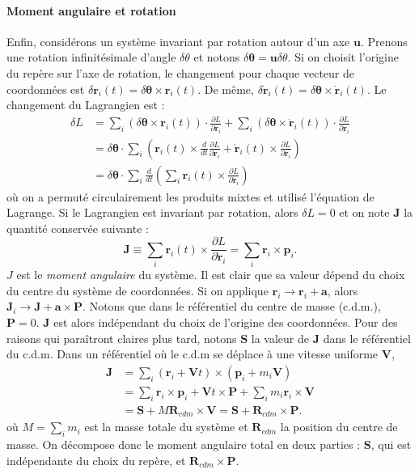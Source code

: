 \paragraph*{Moment angulaire et rotation}
Enfin, considérons un système invariant par rotation autour d'un axe $\bm{u}$. Prenons une rotation infinitésimale d'angle $\delta\theta$ et notons $\delta\bm{\theta}=\bm{u}\delta\theta$. Si on choisit l'origine du repère sur l'axe de rotation, le changement pour chaque vecteur de coordonnées est $\delta\bm{r}_i(t) = \delta\bm{\theta}\times\bm{r}_i(t)$. De même, $\delta\bm{\dot{r}}_i(t) = \delta\bm{\theta}\times\bm{\dot{r}}_i(t)$. Le changement du Lagrangien est :
\begin{align*}
\delta L &=\sum_i \left(\delta\bm{\theta}\times\bm{r}_i(t)\right)\cdot\frac{\partial L}{\partial \bm{r}_i}+\sum_i \left(\delta\bm{\theta}\times\bm{\dot{r}}_i(t)\right)\cdot\frac{\partial L}{\partial \bm{\dot{r}}_i}\\
&=\delta\bm{\theta}\cdot\sum_i\left(\bm{r}_i(t)\times\frac{d}{dt}\frac{\partial L}{\partial {\dot{\bm{r}}}_i}
+\bm{\dot{r}}_i(t)\times\frac{\partial L}{\partial \bm{\dot{r}}_i}\right)\\
&=\delta\bm{\theta}\cdot\sum_i\frac{d}{dt}\left(\sum_i \bm{r}_i(t)\times\frac{\partial L}{\partial \bm{\dot{r}}_i}\right)
\end{align*}
où on a permuté circulairement les produits mixtes et utilisé l'équation de Lagrange. Si le Lagrangien est invariant par rotation, alors $\delta L = 0$ et on note $\bm{J}$ la quantité conservée suivante :
\begin{equation}
\bm{J}\equiv\sum_i \bm{r}_i(t)\times\frac{\partial L}{\partial \bm{\dot{r}}_i}=\sum_i \bm{r}_i\times\bm{p}_i.
\label{eq:defJ}
\end{equation}
$J$ est le \textit{moment angulaire} du système. Il est clair que sa valeur dépend du choix du centre du système de coordonnées. Si on applique $\bm{r}_i\rightarrow \bm{r}_i+\bm{a}$, alors $\bm{J}_i\rightarrow \bm{J}+\bm{a}\times\bm{P}$. Notons que dans le référentiel du centre de masse (c.d.m.), $\bm{P}=0$. $\bm{J}$ est alors indépendant du choix de l'origine des coordonnées. Pour des raisons qui paraîtront claires plus tard, notons $\bm{S}$ la valeur de $\bm{J}$ dans le référentiel du c.d.m. Dans un référentiel où le c.d.m se déplace à une vitesse uniforme $\bm{V}$, 
\begin{align*}
\bm{J}&=\sum_i \left(\bm{r}_i+\bm{V}t\right)\times\left(\bm{p}_i+m_i\bm{V}\right)\\
&= \sum_i\bm{r}_i\times\bm{p}_i+\bm{V}t\times\bm{P}+\sum_i m_i\bm{r}_i\times\bm{V} \\
&= \bm{S} + M \bm{R}_{cdm}\times\bm{V} = \bm{S} + \bm{R}_{cdm}\times\bm{P}.
\end{align*}
où $M=\sum_i m_i$ est la masse totale du système et $\bm{R}_{cdm}$ la position du centre de masse. On décompose donc le moment angulaire total en deux parties : $\bm{S}$, qui est indépendante du choix du repère, et $\bm{R}_{cdm}\times\bm{P}$.

